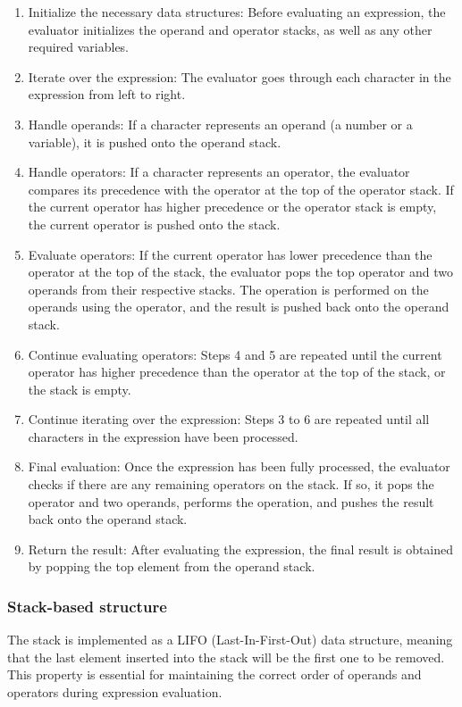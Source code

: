 \documentclass[a4paper, twoside]{report}
\begin{document}
\begin{enumerate}
    \item Initialize the necessary data structures: Before evaluating an expression, the evaluator initializes the operand and operator stacks, as well as any other required variables.
    \item Iterate over the expression: The evaluator goes through each character in the expression from left to right.
    \item Handle operands: If a character represents an operand (a number or a variable), it is pushed onto the operand stack.
    \item Handle operators: If a character represents an operator, the evaluator compares its precedence with the operator at the top of the operator stack. If the current operator has higher precedence or the operator stack is empty, the current operator is pushed onto the stack.
    \item Evaluate operators: If the current operator has lower precedence than the operator at the top of the stack, the evaluator pops the top operator and two operands from their respective stacks. The operation is performed on the operands using the operator, and the result is pushed back onto the operand stack.
    \item Continue evaluating operators: Steps 4 and 5 are repeated until the current operator has higher precedence than the operator at the top of the stack, or the stack is empty.
    \item Continue iterating over the expression: Steps 3 to 6 are repeated until all characters in the expression have been processed.
    \item Final evaluation: Once the expression has been fully processed, the evaluator checks if there are any remaining operators on the stack. If so, it pops the operator and two operands, performs the operation, and pushes the result back onto the operand stack.
    \item Return the result: After evaluating the expression, the final result is obtained by popping the top element from the operand stack.
\end{enumerate}

\subsubsection{Stack-based structure}
The stack is implemented as a LIFO (Last-In-First-Out) data structure, meaning that the last element inserted into the stack will be the first one to be removed. This property is essential for maintaining the correct order of operands and operators during expression evaluation.
\end{document}
